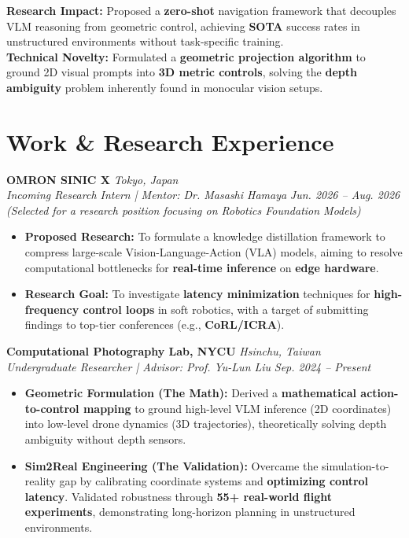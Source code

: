 \documentclass[10pt,letterpaper]{article}
\newenvironment{hangitems}{%
  \begin{itemize}[leftmargin=1.6em,labelsep=0.4em,topsep=2pt,itemsep=2pt,parsep=0pt]
}{%
  \end{itemize}
}
\begin{document}
\vspace{2pt}
\noindent
\textbf{Research Impact:} Proposed a \textbf{zero-shot} navigation framework that decouples VLM reasoning from geometric control, achieving \textbf{SOTA} success rates in unstructured environments without task-specific training.\\
\textbf{Technical Novelty:} Formulated a \textbf{geometric projection algorithm} to ground 2D visual prompts into \textbf{3D metric controls}, solving the \textbf{depth ambiguity} problem inherently found in monocular vision setups.

\section*{Work \& Research Experience}

\noindent
\textbf{OMRON SINIC X} \hfill \textit{Tokyo, Japan}\\
\textit{Incoming Research Intern | Mentor: Dr. Masashi Hamaya} \hfill \textit{Jun. 2026 – Aug. 2026}\\
\textit{(Selected for a research position focusing on Robotics Foundation Models)}
\begin{hangitems}
    \item \textbf{Proposed Research:} To formulate a knowledge distillation framework to compress large-scale Vision-Language-Action (VLA) models, aiming to resolve computational bottlenecks for \textbf{real-time inference} on \textbf{edge hardware}.
    \item \textbf{Research Goal:} To investigate \textbf{latency minimization} techniques for \textbf{high-frequency control loops} in soft robotics, with a target of submitting findings to top-tier conferences (e.g., \textbf{CoRL/ICRA}).
\end{hangitems}

\noindent
\textbf{Computational Photography Lab, NYCU} \hfill \textit{Hsinchu, Taiwan}\\
\textit{Undergraduate Researcher | Advisor: Prof. Yu-Lun Liu} \hfill \textit{Sep. 2024 – Present}
\begin{hangitems}
    \item \textbf{Geometric Formulation (The Math):} Derived a \textbf{mathematical action-to-control mapping} to ground high-level VLM inference (2D coordinates) into low-level drone dynamics (3D trajectories), theoretically solving depth ambiguity without depth sensors.
    \item \textbf{Sim2Real Engineering (The Validation):} Overcame the simulation-to-reality gap by calibrating coordinate systems and \textbf{optimizing control latency}. Validated robustness through \textbf{55+ real-world flight experiments}, demonstrating long-horizon planning in unstructured environments.
\end{hangitems}
\end{document}
